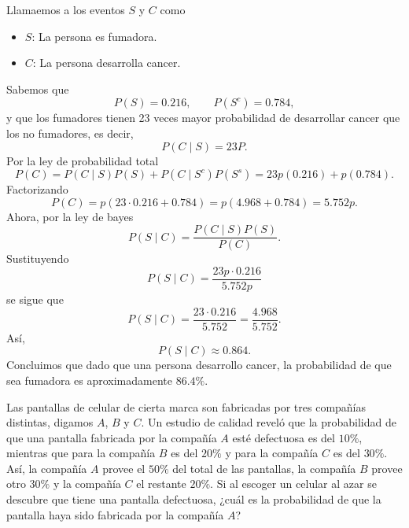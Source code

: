 \documentclass[12pt,a4paper]{article}
\begin{document}
    \begin{solucion}
        Llamaemos a los eventos $S$ y $C$ como
        \begin{itemize}
            \item $S$: La persona es fumadora.
            \item $C$: La persona desarrolla cancer.
        \end{itemize}
        Sabemos que
        \begin{equation*}
            P(S)=0.216,\qquad P(S^{c})=0.784,
        \end{equation*}
        y que los fumadores tienen 23 veces mayor probabilidad de desarrollar cancer que los no fumadores, es decir,
        \begin{equation*}
            P(C\mid S)=23P.
        \end{equation*}
        Por la ley de probabilidad total
        \begin{equation*}
            P(C)=P(C\mid S)P(S)+P(C\mid S^{c})P(S^{s})=23p(0.216)+p(0.784).
        \end{equation*}
        Factorizando
        \begin{equation*}
            P(C)=p(23\cdot0.216+0.784)=p(4.968+0.784)=5.752p.
        \end{equation*}
        Ahora, por la ley de bayes
        \begin{equation*}
            P(S\mid C)=\frac{P(C\mid S)P(S)}{P(C)}.
        \end{equation*}
        Sustituyendo
        \begin{equation*}
            P(S\mid C)=\frac{23p\cdot0.216}{5.752p}
        \end{equation*}
        se sigue que
        \begin{equation*}
            P(S\mid C)=\frac{23\cdot0.216}{5.752}=\frac{4.968}{5.752}.
        \end{equation*}
        Así,
        \begin{equation*}
            P(S\mid C)\approx0.864.
        \end{equation*}
        Concluimos que dado que una persona desarrollo cancer, la probabilidad de que sea fumadora
        es aproximadamente $86.4\%$.
    \end{solucion}

    \begin{mdframed}[style=mdpinkbox,frametitle={Ejercicio 2}]
        Las pantallas de celular de cierta marca son fabricadas por tres compañías distintas, digamos $A$, $B$ y $C$. Un estudio de calidad reveló que la probabilidad de que una pantalla fabricada por la compañía $A$ esté defectuosa es del $10\%$, mientras que para la compañía $B$ es del $20\%$ y para la compañía $C$ es del $30\%$. Así, la compañía $A$ provee el $50\%$ del total de las pantallas, la compañía $B$ provee otro $30\%$ y la compañía $C$ el restante $20\%$. Si al escoger un celular al azar se descubre que tiene una pantalla defectuosa, ¿cuál es la probabilidad de que la pantalla haya sido fabricada por la compañía $A$?
    \end{mdframed}
\end{document}
